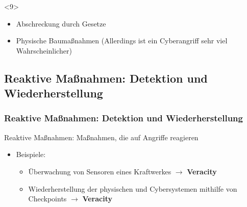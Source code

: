 \documentclass{sikslides}
\begin{document}
\begin{frame}
        \begin{onlyenv}<9>
            \begin{itemize}
                \item Abschreckung durch Gesetze
                \item Physische Baumaßnahmen (Allerdings ist ein Cyberangriff sehr viel Wahrscheinlicher)
            \end{itemize}
        \end{onlyenv}
    \end{frame}

    \subsection{Reaktive Maßnahmen: Detektion und Wiederherstellung}
    \begin{frame}
        \frametitle{Reaktive Maßnahmen: Detektion und Wiederherstellung}
        \begin{block}{}
            Reaktive Maßnahmen: Maßnahmen, die auf Angriffe reagieren
        \end{block}
        \begin{itemize}
            \item Beispiele:
            \begin{itemize}
                \item Überwachung von Sensoren eines Kraftwerkes $\rightarrow$ \textbf{Veracity}
                \item Wiederherstellung der physischen und Cybersystemen mithilfe von Checkpoints $\rightarrow$ \textbf{Veracity}
            \end{itemize}
        \end{itemize}
    \end{frame}
\end{document}
